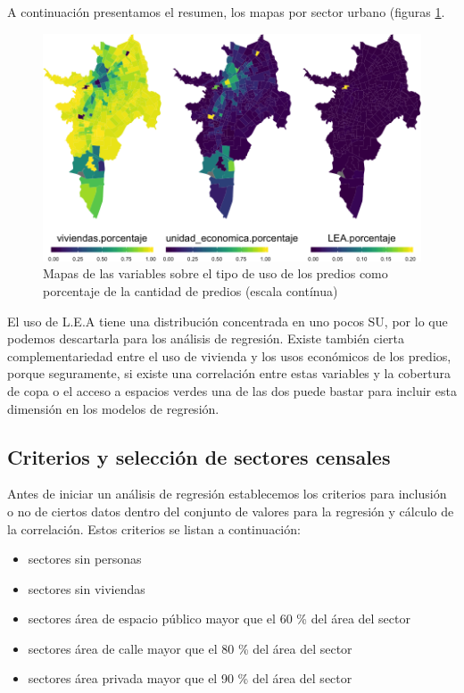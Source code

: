 \documentclass[12pt,]{book}
\providecommand{\tightlist}{%
  \setlength{\itemsep}{0pt}\setlength{\parskip}{0pt}}
\begin{document}
A continuación presentamos el resumen, los mapas por sector urbano
(figuras \ref{fig:mapas-usopredios-cont}.

\begin{figure}
\includegraphics[width=1\linewidth]{tesis-unigis_files/figure-latex/mapas-usopredios-cont-1} \caption{Mapas de las variables sobre el tipo de uso de los predios como porcentaje de la cantidad de predios (escala contínua)}\label{fig:mapas-usopredios-cont}
\end{figure}

El uso de L.E.A tiene una distribución concentrada en uno pocos SU, por
lo que podemos descartarla para los análisis de regresión. Existe
también cierta complementariedad entre el uso de vivienda y los usos
económicos de los predios, porque seguramente, si existe una correlación
entre estas variables y la cobertura de copa o el acceso a espacios
verdes una de las dos puede bastar para incluir esta dimensión en los
modelos de regresión.

\subsection{Criterios y selección de sectores
censales}\label{criterios-y-seleccion-de-sectores-censales}

Antes de iniciar un análisis de regresión establecemos los criterios
para inclusión o no de ciertos datos dentro del conjunto de valores para
la regresión y cálculo de la correlación. Estos criterios se listan a
continuación:

\begin{itemize}
\tightlist
\item
  sectores sin personas
\item
  sectores sin viviendas
\item
  sectores área de espacio público mayor que el 60 \% del área del
  sector
\item
  sectores área de calle mayor que el 80 \% del área del sector
\item
  sectores área privada mayor que el 90 \% del área del sector
\end{itemize}
\end{document}
